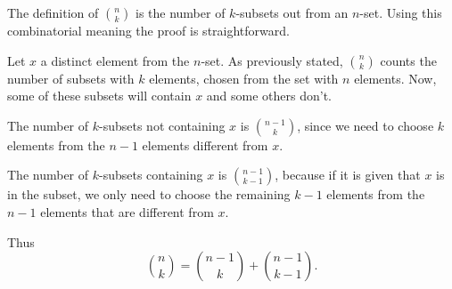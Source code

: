 \documentclass[12pt]{article}
\begin{document}
The definition of $\binom{n}{k}$ is the number of $k$-subsets out from an $n$-set. Using this combinatorial meaning the proof is straightforward.

Let $x$ a distinct element from the $n$-set. As previously stated, $\binom{n}{k}$ counts the number of subsets with $k$ elements, chosen from the set with $n$ elements. Now, some of these subsets will contain $x$ and some others don't.

The number of $k$-subsets not containing $x$ is $\binom{n-1}{k}$, since we need to choose $k$ elements from the $n-1$ elements different from $x$.

The number of $k$-subsets containing $x$ is $\binom{n-1}{k-1}$, because if it is given that $x$ is in the subset, we only need to choose the remaining $k-1$ elements from the $n-1$ elements that are different from $x$.

Thus
\[
\binom{n}{k} = \binom{n-1}{k} + \binom{n-1}{k-1}.
\]
\end{document}
